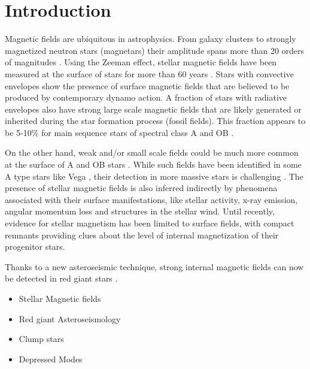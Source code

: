 \section{Introduction}
\label{intro}
Magnetic fields are ubiquitous in astrophysics. From  galaxy clusters to strongly magnetized neutron stars (magnetars) their amplitude spans more than 20 orders of magnitudes \citep{Brandenburg_2005}. Using the Zeeman effect, stellar magnetic fields have been measured at the surface of stars
for more than 60 years \citep{Babcock_1947,Landstreet_1992,Donati_2009}. Stars with convective envelopes show the presence of surface magnetic fields that are believed to be produced by contemporary dynamo action. A fraction of stars with radiative envelopes also have strong large scale magnetic fields that are likely generated or inherited during the star formation process (fossil fields). This fraction appears to be 5-10\% for main sequence stars of spectral class A \citep[e.g.,][]{Auri_re_2004} and OB \citep{2012ASPC..464..405W}.

On the other hand, weak and/or small scale fields could be much more common at the surface of A and OB stars \citep{Cantiello_2011}. While such fields have been identified in some A type stars like Vega \cite{Ligni_res_2009}, their detection in more massive stars is challenging \cite{2013A&A...554A..93K}. The presence of stellar magnetic fields is also inferred indirectly by phenomena associated with their surface manifestations, like stellar activity, x-ray emission, angular momentum loss and structures in the stellar wind. Until recently, evidence for stellar magnetism has been limited to surface fields, with compact remnants providing clues about the level of internal magnetization of their progenitor stars.

Thanks to a new asteroseismic technique, strong internal magnetic fields can now be detected in red giant stars \cite{Fuller_2015}. 
\begin{itemize}
\item Stellar Magnetic fields
\item Red giant Asteroseismology
\item Clump stars
\item Depressed Modes
\end{itemize}


  